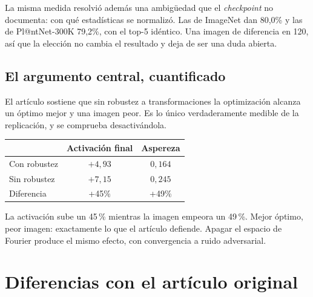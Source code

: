 \documentclass[11pt,a4paper]{article}
\begin{document}
La misma medida resolvió además una ambigüedad que el \emph{checkpoint} no
documenta: con qué estadísticas se normalizó. Las de ImageNet dan 80,0\% y
las de Pl@ntNet-300K 79,2\%, con el top-5 idéntico. Una imagen de
diferencia en 120, así que la elección no cambia el resultado y deja de ser
una duda abierta.

\subsection{El argumento central, cuantificado}

El artículo sostiene que sin robustez a transformaciones la optimización
alcanza un óptimo mejor y una imagen peor. Es lo único verdaderamente
medible de la replicación, y se comprueba desactivándola.

\begin{center}
\begin{minipage}{\linewidth}
\vspace{2pt}
\centering\small
\begin{tabular}{l c c}
\toprule
 & \textbf{Activación final} & \textbf{Aspereza} \\
\midrule
Con robustez & $+4{,}93$ & $0{,}164$ \\
Sin robustez & $+7{,}15$ & $0{,}245$ \\
\midrule
Diferencia & +45\% & +49\% \\
\bottomrule
\end{tabular}
\end{minipage}
\end{center}

La activación sube un 45\,\% mientras la imagen empeora un 49\,\%. Mejor
óptimo, peor imagen: exactamente lo que el artículo defiende. Apagar el
espacio de Fourier produce el mismo efecto, con convergencia a ruido
adversarial.

\section{Diferencias con el artículo original}
\end{document}
